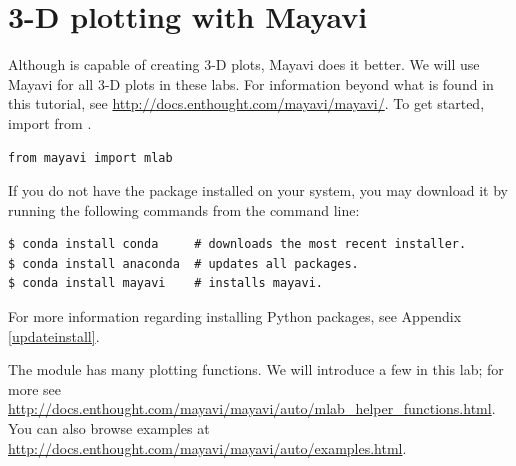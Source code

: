 \section*{3-D plotting with Mayavi}

Although  is capable of creating 3-D plots, Mayavi does it better. 
We will use Mayavi for all 3-D plots in these labs.
For information beyond what is found in this tutorial, see \url{http://docs.enthought.com/mayavi/mayavi/}.
To get started, import  from .
\begin{lstlisting}
from mayavi import mlab
\end{lstlisting}

\begin{info}
If you do not have the  package installed on your system, you may download it by running the following commands from the command line:
\begin{lstlisting}
$ conda install conda     # downloads the most recent installer.
$ conda install anaconda  # updates all packages.
$ conda install mayavi    # installs mayavi.
\end{lstlisting}

For more information regarding installing Python packages, see Appendix \ref{updateinstall}.
\end{info}

The module  has many plotting functions.
We will introduce a few in this lab; for more see \url{http://docs.enthought.com/mayavi/mayavi/auto/mlab_helper_functions.html}.
You can also browse examples at \url{http://docs.enthought.com/mayavi/mayavi/auto/examples.html}.

